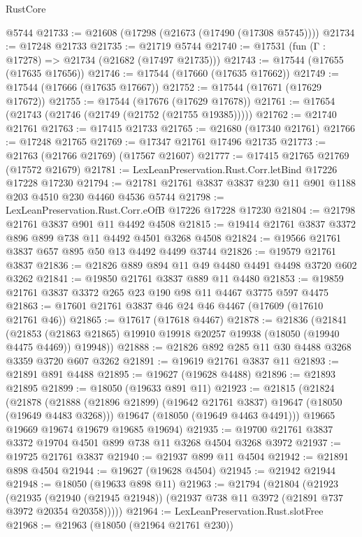 \begin{lexlean}{RustCore}
\begin{coremodule}
    @5744
@21733 := @21608 (@17298 (@21673 (@17490 (@17308 @5745))))
@21734 := @17248 @21733
@21735 := @21719 @5744
@21740 := @17531 (fun (Γ : @17278) => @21734 (@21682 (@17497 @21735)))
@21743 := @17544 (@17655 (@17635 @17656))
@21746 := @17544 (@17660 (@17635 @17662))
@21749 := @17544 (@17666 (@17635 @17667))
@21752 := @17544 (@17671 (@17629 @17672))
@21755 := @17544 (@17676 (@17629 @17678))
@21761 := @17654 (@21743 (@21746 (@21749 (@21752 (@21755 @19385)))))
@21762 := @21740 @21761
@21763 := @17415 @21733
@21765 := @21680 (@17340 @21761)
@21766 := @17248 @21765
@21769 := @17347 @21761 @17496 @21735
@21773 := @21763 (@21766 @21769) (@17567 @21607)
@21777 := @17415 @21765 @21769 (@17572 @21679)
@21781 := LexLeanPreservation.Rust.Corr.letBind @17226 @17228 @17230
@21794 := @21781 @21761 @3837 @3837 @230 @11 @901 @1188 @203 @4510 @230 @4460 @4536 @5744
@21798 := LexLeanPreservation.Rust.Corr.eOfB @17226 @17228 @17230
@21804 := @21798 @21761 @3837 @901 @11 @4492 @4508
@21815 := @19414 @21761 @3837 @3372 @896 @899 @738 @11 @4492 @4501 @3268 @4508
@21824 := @19566 @21761 @3837 @657 @895 @50 @13 @4492 @4499 @3744
@21826 := @19579 @21761 @3837
@21836 := @21826 @889 @894 @11 @49 @4480 @4491 @4498 @3720 @602 @3262
@21841 := @19850 @21761 @3837 @889 @11 @4480
@21853 := @19859 @21761 @3837 @3372 @265 @23 @190 @98 @11 @4467 @3775 @597 @4475
@21863 := @17601 @21761 @3837 @46 @24 @46 @4467 (@17609 (@17610 @21761 @46))
@21865 := @17617 (@17618 @4467)
@21878 := @21836
    (@21841
      (@21853 (@21863 @21865) @19910 @19918 @20257 @19938 (@18050 (@19940 @4475 @4469)) @19948))
@21888 := @21826 @892 @285 @11 @30 @4488 @3268 @3359 @3720 @607 @3262
@21891 := @19619 @21761 @3837 @11
@21893 := @21891 @891 @4488
@21895 := @19627 (@19628 @4488)
@21896 := @21893 @21895
@21899 := @18050 (@19633 @891 @11)
@21923 := @21815
    (@21824
      (@21878
        (@21888 (@21896 @21899) (@19642 @21761 @3837) @19647 (@18050 (@19649 @4483 @3268)))
        @19647
        (@18050 (@19649 @4463 @4491)))
      @19665
      @19669
      @19674
      @19679
      @19685
      @19694)
@21935 := @19700 @21761 @3837 @3372 @19704 @4501 @899 @738 @11 @3268 @4504 @3268 @3972
@21937 := @19725 @21761 @3837
@21940 := @21937 @899 @11 @4504
@21942 := @21891 @898 @4504
@21944 := @19627 (@19628 @4504)
@21945 := @21942 @21944
@21948 := @18050 (@19633 @898 @11)
@21963 := @21794
    (@21804
      (@21923
        (@21935
          (@21940 (@21945 @21948))
          (@21937 @738 @11 @3972 (@21891 @737 @3972 @20354 @20358)))))
@21964 := LexLeanPreservation.Rust.slotFree
@21968 := @21963 (@18050 (@21964 @21761 @230))

\end{coremodule}
\end{lexlean}
